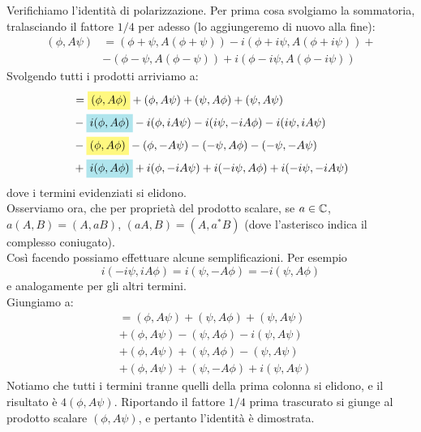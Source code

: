 \documentclass[FisicaTeorica.tex]{subfiles}
\begin{document}
	\begin{expl}
	Verifichiamo l'identità di polarizzazione. Per prima cosa svolgiamo la sommatoria, tralasciando il fattore $1/4$ per adesso (lo aggiungeremo di nuovo alla fine):
	\begin{align*}
	    (\phi, A\psi) &= (\phi+\psi, A(\phi +\psi))-i(\phi+i\psi, A(\phi+i\psi))+\\
	    & -(\phi-\psi, A(\phi-\psi)) +i(\phi-i\psi,A(\phi-i\psi))
	\end{align*}
	Svolgendo tutti i prodotti arriviamo a:
	\begin{align*}
	    &= \hlc{Yellow}{(\phi,A\phi)} + (\phi,A\psi) + (\psi,A\phi) + (\psi,A\psi)\\
	    &- \hlc{SkyBlue}{i(\phi,A\phi)} -i(\phi, iA\psi) -i(i\psi, -iA\phi) -i(i\psi, iA\psi)\\
	    &- \hlc{Yellow}{(\phi,A\phi)}  -(\phi, -A\psi) -(-\psi, A\phi) -(-\psi, -A\psi)\\
	    &+ \hlc{SkyBlue}{i(\phi, A\phi)} + i(\phi, -iA\psi) +i(-i\psi, A\phi) + i(-i\psi, -iA\psi)
	\end{align*}
	dove i termini evidenziati si elidono.\\
	Osserviamo ora, che per proprietà del prodotto scalare, se $a\in \mathbb{C}$, $a(A,B) = (A,aB)$, $(aA,B) = (A, a^* B)$ (dove l'asterisco indica il complesso coniugato).\\
	Così facendo possiamo effettuare alcune semplificazioni. Per esempio
	\[ i(-i\psi, iA\phi) = i(\psi,-A\phi) = -i(\psi,A\phi) \]
	e analogamente per gli altri termini.\\
	Giungiamo a:
	\begin{align*}%
	    &= (\phi,A\psi)+(\psi, A\phi)+(\psi, A\psi)\\
	    &+ (\phi, A\psi) -(\psi,A\phi) -i(\psi,A\psi)\\
	    &+ (\phi, A\psi) +(\psi,A\phi) -(\psi, A\psi)\\
	    &+ (\phi, A\psi) + (\psi, -A\phi) +i(\psi,A\psi)
	\end{align*}
	Notiamo che tutti i termini tranne quelli della prima colonna si elidono, e il risultato è $4(\phi, A\psi)$. Riportando il fattore $1/4$ prima trascurato si giunge al prodotto scalare $(\phi, A\psi)$, e pertanto l'identità è dimostrata.
	\end{expl}
\end{document}
